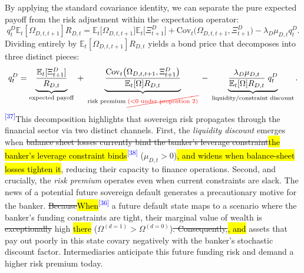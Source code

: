 \documentclass[11pt]{article}
\newcommand{\E}{\mathbb{E}}
\newcommand{\A}[1]{\hl{#1}}
\newcommand{\D}[1]{{\color{red}\st{#1}}}
\newcommand{\Dm}[1]{{\color{red}\cancel{#1}}}
\newcommand{\chg}[1]{\textsuperscript{\textcolor{blue}{\scriptsize[#1]}}}
\begin{document}
By applying the standard covariance identity, we can separate the pure expected payoff from the risk adjustment within the expectation operator:
\begin{equation}
q^D_t \E_t[\Omega_{D,t,t+1}] R_{D,t} = \E_t\bigl[\Omega_{D,t,t+1}\bigr] \E_t\bigl[\Xi^D_{t+1}\bigr] + \mathrm{Cov}_t\bigl(\Omega_{D,t,t+1}, \Xi^D_{t+1}\bigr) - \lambda_D\mu_{D,t} q^D_t.
\end{equation}
Dividing entirely by $\E_t[\Omega_{D,t,t+1}] R_{D,t}$ yields a bond price that decomposes into three distinct pieces:
\begin{equation}
q^D_t
=\underbrace{\frac{\E_t[\Xi^D_{t+1}]}{R_{D,t}}}_{\text{expected payoff}}
\;+\;\underbrace{\frac{\mathrm{Cov}_t\bigl(\Omega_{D,t,t+1},\Xi^D_{t+1}\bigr)}
                       {\E_t[\Omega]R_{D,t}}}_{\text{risk premium}\;\Dm{(<0 \text{ under propostion 2)}}}
\;-\;\underbrace{\frac{\lambda_D\mu_{D,t}}
     {\E_t[\Omega]R_{D,t}}\;q^D_t}_{\text{liquidity/constraint discount}} .
\label{eq:bond-decomposition}
\end{equation}
\chg{37}This decomposition highlights that sovereign risk propagates through the financial sector via two distinct channels. First, the \emph{liquidity discount} emerges when \D{balance sheet losses currently bind the banker's leverage constraint}\A{the banker's leverage constraint binds}\chg{38} ($\mu_{D,t} > 0$)\A{, and widens when balance-sheet losses tighten it}, reducing their capacity to finance operations. Second, and crucially, the \emph{risk premium} operates even when current constraints are slack. The news of a potential future sovereign default generates a precautionary motive for the banker. \D{Because}\A{When}\chg{36} a future default state maps to a scenario where the banker's funding constraints are tight, their marginal value of wealth is \D{exceptionally} high \A{there} ($\Omega^{(d=1)} > \Omega^{(d=0)}$)\D{. Consequently,}\A{, and} assets that pay out poorly in this state covary negatively with the banker's stochastic discount factor. Intermediaries anticipate this future funding risk and demand a higher risk premium today.
\end{document}
